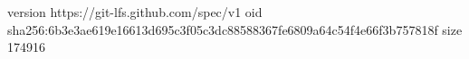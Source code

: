 version https://git-lfs.github.com/spec/v1
oid sha256:6b3e3ae619e16613d695c3f05c3dc88588367fe6809a64c54f4e66f3b757818f
size 174916
